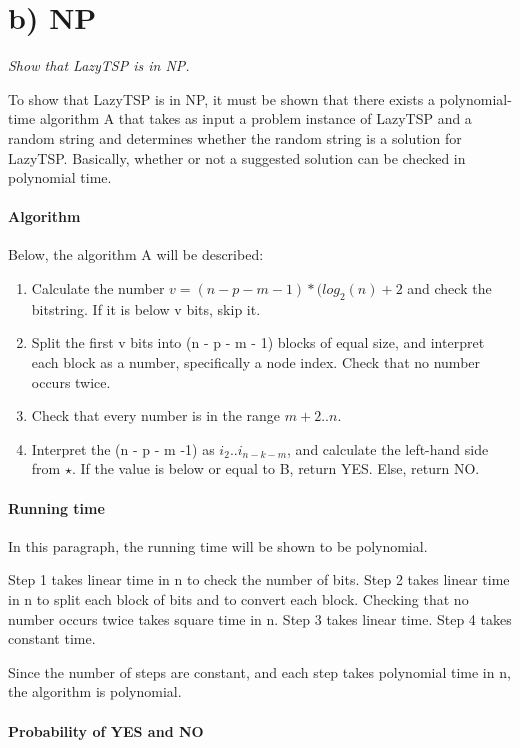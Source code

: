 
\section{b) NP}

\textit{Show that LazyTSP is in NP.}

To show that LazyTSP is in NP, it must be shown that
there exists a polynomial-time algorithm A that takes
as input a problem instance of LazyTSP and a random string
and determines whether the random string is a solution for
LazyTSP. Basically, whether or not a suggested solution
can be checked in polynomial time.

\paragraph{Algorithm}

Below, the algorithm A will be described:

\begin{enumerate}
\item	Calculate the number \(v = (n - p - m - 1)*(log_2(n)+2\) and check the bitstring.
		If it is below v bits, skip it.
\item	Split the first v bits into (n - p - m - 1) blocks of equal size, and interpret each block
		as a number, specifically a node index. Check that no number occurs twice.
\item	Check that every number is in the range \(m+2..n\).
\item	Interpret the (n - p - m -1) as \(i_2..i_{n-k-m}\), and calculate the left-hand side from \(\star\).
		If the value is below or equal to B, return YES. Else, return NO.
\end{enumerate}

\paragraph{Running time}

In this paragraph, the running time will be shown to be polynomial.

Step 1 takes linear time in n to check the number of bits.
Step 2 takes linear time in n to split each block of bits and to
convert each block. Checking that no number occurs twice takes square time in n.
Step 3 takes linear time.
Step 4 takes constant time.

Since the number of steps are constant, and each step takes polynomial time in n,
the algorithm is polynomial.

\paragraph{Probability of YES and NO}

